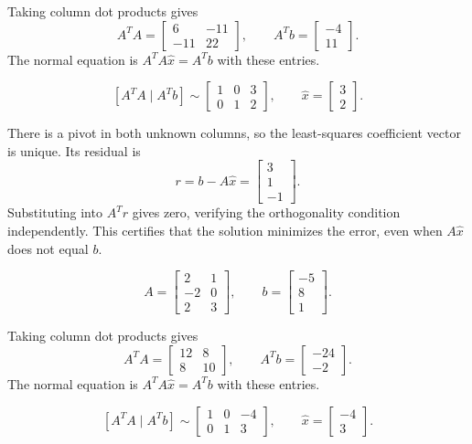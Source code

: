Taking column dot products gives
\[ A^TA=\begin{bmatrix}6 & -11\\-11 & 22\end{bmatrix},\qquad A^Tb=\begin{bmatrix}-4\\11\end{bmatrix}.\]
The normal equation is $A^TA\widehat x=A^Tb$ with these entries.

\[ [A^TA\mid A^Tb]\sim \begin{bmatrix}1 & 0 & 3\\0 & 1 & 2\end{bmatrix},\qquad \widehat x=\begin{bmatrix}3\\2\end{bmatrix}.\]

There is a pivot in both unknown columns, so the least-squares coefficient vector is unique. Its residual is
\[ r=b-A\widehat x=\begin{bmatrix}3\\1\\-1\end{bmatrix}.\]
Substituting into $A^Tr$ gives zero, verifying the orthogonality condition independently. This certifies that the solution minimizes the error, even when $A\widehat x$ does not equal $b$.

\[ A=\begin{bmatrix}2 & 1\\-2 & 0\\2 & 3\end{bmatrix},\qquad b=\begin{bmatrix}-5\\8\\1\end{bmatrix}.\]

Taking column dot products gives
\[ A^TA=\begin{bmatrix}12 & 8\\8 & 10\end{bmatrix},\qquad A^Tb=\begin{bmatrix}-24\\-2\end{bmatrix}.\]
The normal equation is $A^TA\widehat x=A^Tb$ with these entries.

\[ [A^TA\mid A^Tb]\sim \begin{bmatrix}1 & 0 & -4\\0 & 1 & 3\end{bmatrix},\qquad \widehat x=\begin{bmatrix}-4\\3\end{bmatrix}.\]

